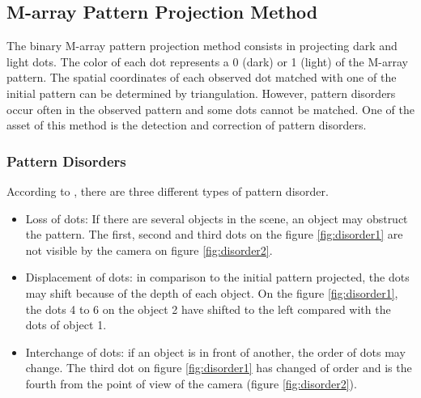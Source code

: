 \subsection{M-array Pattern Projection Method \cite{morita1988reconstruction}}

The binary M-array pattern projection method consists in projecting dark and light dots. The color of each dot represents a 0 (dark) or 1 (light) of the M-array pattern. The spatial coordinates of each observed dot matched with one of the initial pattern can be determined by triangulation. However, pattern disorders occur often in the observed pattern and some dots cannot be matched. One of the asset of this method is the detection and correction of pattern disorders.

\subsubsection{Pattern Disorders}
\label{PatternDisorders}
According to \cite{morita1988reconstruction}, there are three different types of pattern disorder.
\begin{itemize}
\item Loss of dots: If there are several objects in the scene, an object may obstruct the pattern. The first, second and third dots on the figure \ref{fig:disorder1} are not visible by the camera on figure \ref{fig:disorder2}.
\item Displacement of dots: in comparison to the initial pattern projected, the dots may shift because of the depth of each object. On the figure \ref{fig:disorder1}, the dots 4 to 6 on the object 2 have shifted to the left compared with the dots of object 1.
\item Interchange of dots: if an object is in front of another, the order of dots may change. The third dot on figure \ref{fig:disorder1} has changed of order and is the fourth from the point of view of the camera (figure \ref{fig:disorder2}).
\end{itemize}

